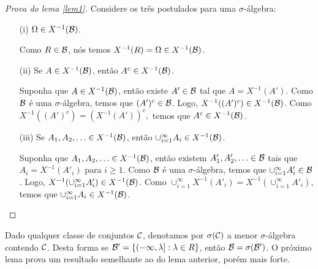 \begin{frame}


\begin{proof}[Prova do lema \ref{lem1}]
 Considere os três postulados para uma $\sigma$-álgebra:
\begin{enumerate}
\item[(i)] $\Omega\in X^{-1}({\cal B})$.

Como $R\in {\cal B}$, nós temos $X^{-1}(R)=\Omega\in X^{-1}({\cal B})$.

\item[(ii)] Se $A\in X^{-1}({\cal B})$, então $A^c\in X^{-1}({\cal B})$.

Suponha que  $A\in X^{-1}({\cal B})$, então existe $A'\in{\cal B}$ tal que $A=X^{-1}(A')$. Como ${\cal B}$ é uma $\sigma$-álgebra, temos que $(A')^c\in {\cal B}$. Logo, $X^{-1}((A')^c)\in X^{-1}({\cal B})$. Como
$X^{-1}((A')^c)=(X^{-1}(A'))^c,$ temos que $A^c\in X^{-1}({\cal B})$.

\item[(iii)] Se $A_1,A_2,\ldots \in X^{-1}({\cal B})$, então $\cup_{i=1}^{\infty} A_i\in X^{-1}({\cal B})$.

Suponha que  $A_1,A_2,\ldots \in X^{-1}({\cal B})$, então existem $A'_1,A'_2,\ldots \in{\cal B}$ tais que $A_i=X^{-1}(A'_i)$ para $i\geq 1$. Como ${\cal B}$ é uma $\sigma$-álgebra, temos que $\cup_{i=1}^{\infty}A'_i\in {\cal B}$. Logo, $X^{-1}(\cup_{i=1}^{\infty}A'_i)\in X^{-1}({\cal B})$. Como $\cup_{i=1}^{\infty} X^{-1}(A'_i)=X^{-1}(\cup_{i=1}^{\infty} A'_i)$, temos que $\cup_{i=1}^{\infty} A_i\in X^{-1}({\cal B})$.
\end{enumerate}
%
\end{proof}

\bigskip
Dado qualquer classe de conjuntos ${\cal C}$, denotamos por $\sigma({\cal C})$ a
menor $\sigma$-álgebra contendo ${\cal C}$. Desta forma se
${\cal B}'=\{(-\infty,\lambda]:\lambda\in R\}$, então ${\cal B}=\sigma({\cal B}')$. O
próximo lema prova um resultado semelhante ao do lema anterior,
porém mais forte.
\end{frame}
